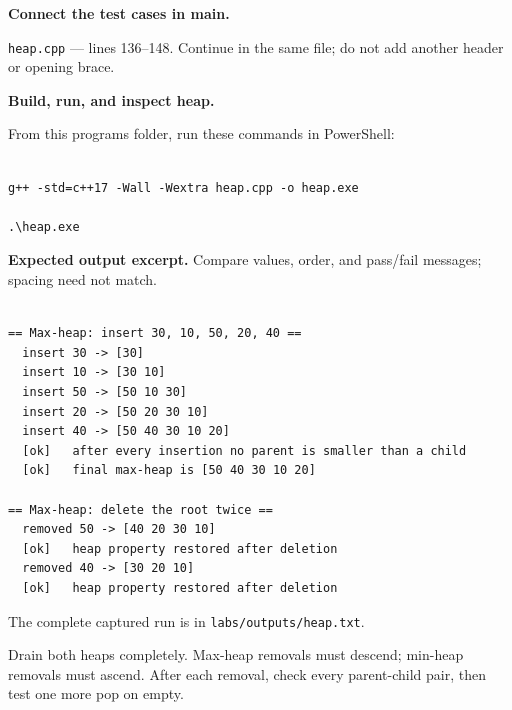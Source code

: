 


\tcbbreak

\begin{utpsteps}\setcounter{enumi}{4}\item \textbf{Connect the test cases in main.}\end{utpsteps}

\texttt{heap.cpp} --- lines 136--148. Continue in the same file; do not add another header or opening brace.




\tcbbreak

\textbf{Build, run, and inspect heap.}

From this program\textquotesingle s folder, run these commands in PowerShell:

\begin{lstlisting}[style=utpterminal,language={}]

g++ -std=c++17 -Wall -Wextra heap.cpp -o heap.exe

.\heap.exe

\end{lstlisting}

\textbf{Expected output excerpt.} Compare values, order, and pass/fail messages; spacing need not match.

\begin{lstlisting}[style=utpterminal,language={}]

== Max-heap: insert 30, 10, 50, 20, 40 ==
  insert 30 -> [30]
  insert 10 -> [30 10]
  insert 50 -> [50 10 30]
  insert 20 -> [50 20 30 10]
  insert 40 -> [50 40 30 10 20]
  [ok]   after every insertion no parent is smaller than a child
  [ok]   final max-heap is [50 40 30 10 20]

== Max-heap: delete the root twice ==
  removed 50 -> [40 20 30 10]
  [ok]   heap property restored after deletion
  removed 40 -> [30 20 10]
  [ok]   heap property restored after deletion

\end{lstlisting}

The complete captured run is in \texttt{labs/outputs/heap.txt}.

\begin{tryit}

Drain both heaps completely. Max-heap removals must descend; min-heap removals must ascend. After each removal, check every parent-child pair, then test one more pop on empty.

\end{tryit}
